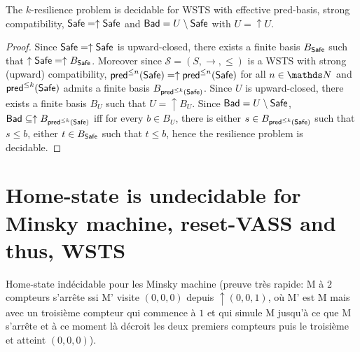 \begin{theorem}\label{k-up-up}
The %
$k$-resilience problem is decidable for WSTS with effective pred-basis, strong %
compatibility, $\textsf{Safe}=\uparrow \textsf{Safe}$
and $\textsf{Bad}=U \setminus \textsf{Safe}$  with $U = \uparrow U$.
\end{theorem}

\begin{proof}
Since $\textsf{Safe}=\uparrow \textsf{Safe}$ is upward-closed, there exists a finite basis $B_{ \textsf{Safe}}$ such that $\uparrow \textsf{Safe} = \uparrow B_{\textsf{Safe}}$. 
Moreover since $\mathscr{S}=(S,\rightarrow,\leq)$ is a WSTS with strong (upward) compatibility,  $\textsf{pred}^{\leq n}(\textsf{Safe})=\uparrow \textsf{pred}^{\leq n}(\textsf{Safe})$ for all $n\in \N$ and $\textsf{pred}^{\leq k}(\textsf{Safe})$ admits a finite basis $B_{\textsf{pred}^{\leq k}(\textsf{Safe})}$. %
Since $U$  is upward-closed, there exists a finite basis $B_{U}$ such that $U = \uparrow B_{U}$. %
Since $\textsf{Bad} = U \setminus \textsf{Safe}$, $\textsf{Bad} \subseteq \uparrow B_{\textsf{pred}^{\leq k}(\textsf{Safe})}$ iff for every $b \in B_{U}$, there is either $s \in B_{\textsf{pred}^{\leq k}(\textsf{Safe})}$ such that $s \leq b$, either $t \in B_{\textsf{Safe}}$ such that $t\leq b$,
hence the resilience problem is decidable.
\end{proof}




\section{Home-state is undecidable for Minsky machine, reset-VASS and thus, WSTS}\label{HS-Minsk}

Home-state indécidable pour les Minsky machine (preuve très rapide: M à $2$ compteurs s'arrête ssi M' visite $(0,0,0)$ depuis $\uparrow(0,0,1)$, où M' est M mais avec un troisième compteur qui commence à $1$ et qui simule M jusqu'à ce que M s'arrête et à ce moment là décroit les deux premiers compteurs puis le troisième et atteint $(0,0,0)$).


